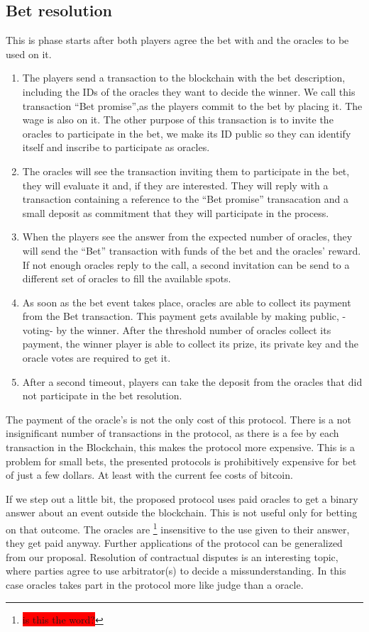 \subsection{Bet resolution}
This is phase starts after both players agree the bet with and the oracles to
  be used on it.

\begin{enumerate}
  \item The players send a transaction to the blockchain with the bet
      description, including the IDs of the oracles they want to decide the
      winner.
    We call this transaction ``Bet promise'',as the players commit to the bet by
      placing it. The wage is also on it.
    The other purpose of this transaction is to invite the oracles to
      participate in the bet, we make its ID public so they can identify itself
      and inscribe to participate as oracles.
  \item The oracles will see the transaction inviting them to participate in the
      bet, they will evaluate it and, if they are interested.
    They will reply with a transaction containing a reference to the ``Bet
      promise'' transacation and a small deposit as commitment that they will
      participate in the process.
  \item When the players see the answer from the expected number of oracles,
  	  they will send the ``Bet'' transaction with funds of the bet and the
  	  oracles' reward.
  	If not enough oracles reply to the call, a second invitation can be send to
  	  a different set of oracles to fill the available spots.
  \item As soon as the bet event takes place, oracles are able to collect its
  	  payment from the Bet transaction. This payment gets available by making
  	  public, -voting- by the winner.
  	After the threshold number of oracles collect its payment, the winner player
  	  is able to collect its prize, its private key and the oracle votes are
  	  required to get it.
  \item After a second timeout, players can take the deposit from the oracles
  	  that did not participate in the bet resolution.
\end{enumerate}

The payment of the oracle's is not the only cost of this protocol.
There is a not insignificant number of transactions in the protocol, as there
  is a fee by each transaction in the Blockchain, this makes the protocol more
  expensive.
This is a problem for small bets, the presented protocols is prohibitively
  expensive for bet of just a few dollars. At least with the current fee costs
  of bitcoin.

If we step out a little bit, the proposed protocol uses paid oracles to get a
  binary answer about an event outside the blockchain. This is not useful only
  for betting on that outcome. The oracles are \footnote{\colorbox{red}{
  is this the word?}} insensitive to the use given to their answer, they get
  paid anyway. Further applications of the protocol can be generalized from our
  proposal.
Resolution of contractual disputes is an interesting topic, where parties agree
  to use arbitrator(s) to decide a missunderstanding.
In this case oracles takes part in the protocol more like judge than a oracle.
